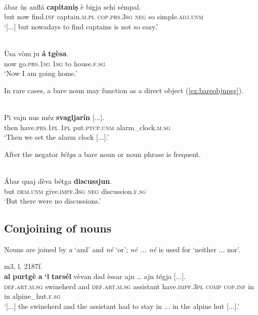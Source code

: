 \ea
\label{ex:bareindefpl}
\\
	\gll [...] ábar ùṣ anflá \textbf{capitaniṣ} è bigja schi sémpal.\\
{} but now find.\textsc{inf} captain.\textsc{m.pl} \textsc{cop.prs.3sg} \textsc{neg} so simple.\textsc{adj.unm}\\
\glt `[...] but nowadays to find captains is not so easy.'
\z

\ea
\label{ex:barepp1}
\\
\gll Ùsa vòm ju \textbf{á} \textbf{tgèsa}.\\
now go.\textsc{prs.1sg} \textsc{1sg} to house.\textsc{f.sg}\\
\glt `Now I am going home.'
\z

In rare cases, a bare noun may function as a direct object (\ref{ex:bareobjnpsg}).

\ea
\label{ex:bareobjnpsg}
\\
\gll Pi vajn nus méz \textbf{svagljarín} [...].\\
then have.\textsc{prs.1pl} \textsc{1pl} put.\textsc{ptcp.unm} alarm\_clock.\textsc{m.sg}\\
\glt `Then we set the alarm clock [...].'
\z

After the negator \textit{bétga} a bare noun or noun phrase is frequent.

\ea
\label{}
\\
	\gll Ábar quaj dèva bétga \textbf{discussjun}.\\
but \textsc{dem.unm} give.\textsc{impf.3sg} \textsc{neg} discussion.\textsc{f.sg}\\
\glt `But there were no discussions.'
\z

\subsection{Conjoining of nouns}
Nouns are joined by \textit{a} `and' and \textit{né} `or'; \textit{né ... né} is used for `neither ... nor'.

\ea
\label{}
 {m3, l. 2187f.}\\
\gll  [...] \textbf{al}  \textbf{purtgè} \textbf{a} \textbf{‘l} \textbf{tarsél} vèvan dad èssar ajn … ajn tégja [...].\\
 {} \textsc{def.art.m.sg} swineherd and \textsc{def.art.m.sg} assistant have.\textsc{impf.3pl} \textsc{comp} \textsc{cop.inf} in {} in alpine\_hut.\textsc{f.sg} \\
\glt `[...] the swineherd and the assistant had to stay in ... in the alpine hut [...].'
\z

